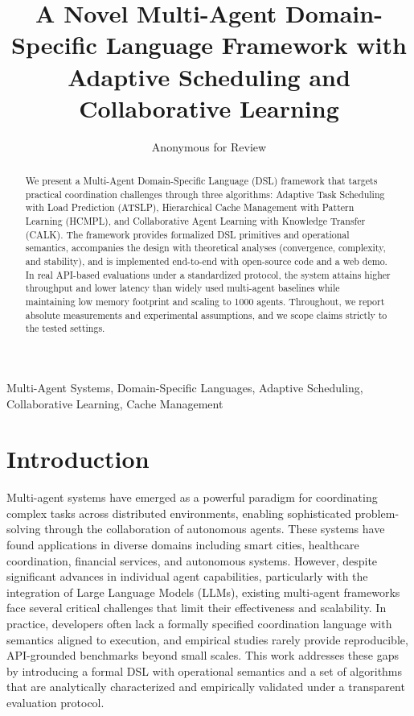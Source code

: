 \documentclass[conference]{IEEEtran}
\begin{document}
\title{A Novel Multi-Agent Domain-Specific Language Framework with Adaptive Scheduling and Collaborative Learning}

\author{Anonymous for Review}

\maketitle

\begin{abstract}
We present a Multi-Agent Domain-Specific Language (DSL) framework that targets practical coordination challenges through three algorithms: Adaptive Task Scheduling with Load Prediction (ATSLP), Hierarchical Cache Management with Pattern Learning (HCMPL), and Collaborative Agent Learning with Knowledge Transfer (CALK). The framework provides formalized DSL primitives and operational semantics, accompanies the design with theoretical analyses (convergence, complexity, and stability), and is implemented end-to-end with open-source code and a web demo. In real API-based evaluations under a standardized protocol, the system attains higher throughput and lower latency than widely used multi-agent baselines while maintaining low memory footprint and scaling to 1000 agents. Throughout, we report absolute measurements and experimental assumptions, and we scope claims strictly to the tested settings.
\end{abstract}

\begin{IEEEkeywords}
Multi-Agent Systems, Domain-Specific Languages, Adaptive Scheduling, Collaborative Learning, Cache Management
\end{IEEEkeywords}

\section{Introduction}

Multi-agent systems have emerged as a powerful paradigm for coordinating complex tasks across distributed environments, enabling sophisticated problem-solving through the collaboration of autonomous agents. These systems have found applications in diverse domains including smart cities, healthcare coordination, financial services, and autonomous systems. However, despite significant advances in individual agent capabilities, particularly with the integration of Large Language Models (LLMs), existing multi-agent frameworks face several critical challenges that limit their effectiveness and scalability. In practice, developers often lack a formally specified coordination language with semantics aligned to execution, and empirical studies rarely provide reproducible, API-grounded benchmarks beyond small scales. This work addresses these gaps by introducing a formal DSL with operational semantics and a set of algorithms that are analytically characterized and empirically validated under a transparent evaluation protocol.
\end{document}
